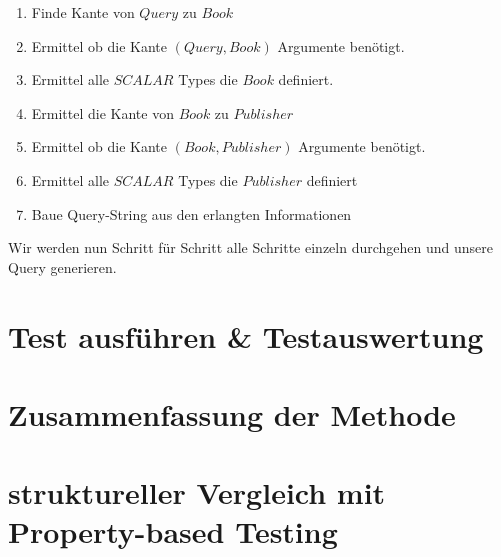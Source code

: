 \begin{enumerate}
    \item Finde Kante von $Query$ zu $Book$
    \item Ermittel ob die Kante $(Query, Book)$ Argumente benötigt.
    \item Ermittel alle $SCALAR$ Types die $Book$ definiert.
    \item Ermittel die Kante von $Book$ zu $Publisher$
    \item Ermittel ob die Kante $(Book, Publisher)$ Argumente benötigt.
    \item Ermittel alle $SCALAR$ Types die $Publisher$ definiert
    \item Baue Query-String aus den erlangten Informationen
\end{enumerate}


Wir werden nun Schritt für Schritt alle Schritte einzeln durchgehen und unsere Query generieren.

\begin{minipage}[t]{0.5\textwidth}
\end{minipage}%

\begin{minipage}[t]{0.5\textwidth}
    \vspace{0.5cm}



\end{minipage}









\section{Test ausführen \& Testauswertung}

\section{Zusammenfassung der Methode}

\section{struktureller Vergleich mit Property-based Testing}
